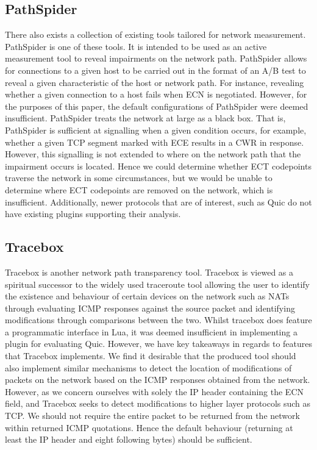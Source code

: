 \documentclass{l4proj}
\begin{document}
\subsection{PathSpider}

There also exists a collection of existing tools tailored for network measurement. PathSpider is one of these tools. It is intended to be used as an active measurement tool to reveal impairments on the network path. PathSpider allows for connections to a given host to be carried out in the format of an A/B test to reveal a given characteristic of the host or network path. For instance, revealing whether a given connection to a host fails when ECN is negotiated. However, for the purposes of this paper, the default configurations of PathSpider were deemed insufficient. PathSpider treats the network at large as a black box. That is, PathSpider is sufficient at signalling when a given condition occurs, for example, whether a given TCP segment marked with ECE results in a CWR in response. However, this signalling is not extended to where on the network path that the impairment occurs is located. Hence we could determine whether ECT codepoints traverse the network in some circumstances, but we would be unable to determine where ECT codepoints are removed on the network, which is insufficient. Additionally, newer protocols that are of interest, such as Quic do not have existing plugins supporting their analysis.

\subsection{Tracebox}

Tracebox is another network path transparency tool. Tracebox is viewed as a spiritual successor to the widely used traceroute tool allowing the user to identify the existence and behaviour of certain devices on the network such as NATs through evaluating ICMP responses against the source packet and identifying modifications through comparisons between the two. Whilst tracebox does feature a programmatic interface in Lua, it was deemed insufficient in implementing a plugin for evaluating Quic. However, we have key takeaways in regards to features that Tracebox implements. We find it desirable that the produced tool should also implement similar mechanisms to detect the location of modifications of packets on the network based on the ICMP responses obtained from the network. However, as we concern ourselves with solely the IP header containing the ECN field, and Tracebox seeks to detect modifications to higher layer protocols such as TCP. We should not require the entire packet to be returned from the network within returned ICMP quotations. Hence the default behaviour (returning at least the IP header and eight following bytes) should be sufficient.
\end{document}
